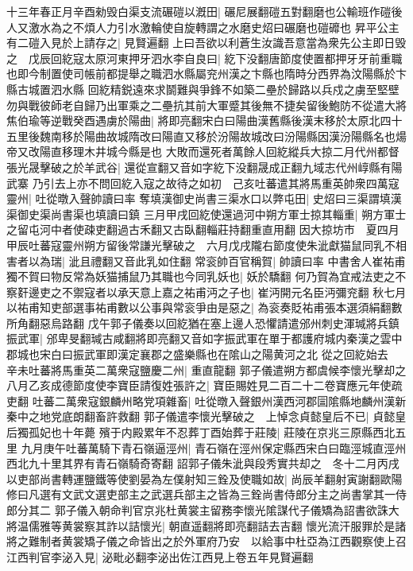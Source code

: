 十三年春正月辛酉勑毁白渠支流碾磑以漑田|{
	碾尼展翻磑五對翻磨也公輸班作磑後人又激水為之不煩人力引水激輪使自旋轉謂之水磨史炤曰碾磨也磑䃺也}
昇平公主有二磑入見於上請存之|{
	見賢遍翻}
上曰吾欲以利蒼生汝識吾意當為衆先公主即日毁之　戊辰回紇寇太原河東押牙泗水李自良曰|{
	紇下没翻唐節度使置都押牙牙前重職也即今制置使司帳前都提舉之職泗水縣屬兖州漢之卞縣也隋時分西界為汶陽縣於卞縣古城置泗水縣}
回紇精鋭遠來求鬬難與爭鋒不如築二壘於歸路以兵戍之虜至堅壁勿與戰彼師老自歸乃出軍乘之二壘抗其前大軍蹙其後無不捷矣留後鮑防不從遣大將焦伯瑜等逆戰癸酉遇虜於陽曲|{
	將即亮翻宋白曰陽曲漢舊縣後漢末移於太原北四十五里後魏南移於陽曲故城隋改曰陽直又移於汾陽故城改曰汾陽縣因漢汾陽縣名也煬帝又改陽直移理木井城今縣是也}
大敗而還死者萬餘人回紇縱兵大掠二月代州都督張光晟擊破之於羊武谷|{
	還從宣翻又音如字紇下没翻晟成正翻九域志代州崞縣有陽武寨}
乃引去上亦不問回紇入寇之故待之如初　己亥吐蕃遣其將馬重英帥衆四萬寇靈州|{
	吐從暾入聲帥讀曰率}
奪填漢御史尚書三渠水口以弊屯田|{
	史炤曰三渠謂填漢渠御史渠尚書渠也填讀曰鎮}
三月甲戌回紇使還過河中朔方軍士掠其輜重|{
	朔方軍士之留屯河中者使疎吏翻過古禾翻又古臥翻輜莊持翻重直用翻}
因大掠坊市　夏四月甲辰吐蕃寇靈州朔方留後常謙光擊破之　六月戊戌隴右節度使朱泚獻猫鼠同乳不相害者以為瑞|{
	泚且禮翻又音此乳如住翻}
常衮帥百官稱賀|{
	帥讀曰率}
中書舍人崔祐甫獨不賀曰物反常為妖猫捕鼠乃其職也今同乳妖也|{
	妖於驕翻}
何乃賀為宜戒法吏之不察姧邊吏之不禦寇者以承天意上嘉之祐甫沔之子也|{
	崔沔開元名臣沔彌兖翻}
秋七月以祐甫知吏部選事祐甫數以公事與常衮爭由是惡之|{
	為衮奏貶祐甫張本選須絹翻數所角翻惡烏路翻}
戊午郭子儀奏以回紇猶在塞上邊人恐懼請遣邠州刺史渾瑊將兵鎮振武軍|{
	邠卑旻翻瑊古咸翻將即亮翻又音如字振武軍在單于都護府城内秦漢之雲中郡城也宋白曰振武軍即漢定襄郡之盛樂縣也在隂山之陽黄河之北}
從之回紇始去　辛未吐蕃將馬重英二萬衆寇鹽慶二州|{
	重直龍翻}
郭子儀遣朔方都虞候李懷光擊却之　八月乙亥成德節度使李寶臣請復姓張許之|{
	寶臣賜姓見二百二十二卷寶應元年使疏吏翻}
吐蕃二萬衆寇銀麟州略党項雜畜|{
	吐從暾入聲銀州漢西河郡圁隂縣地麟州漢新秦中之地党底朗翻畜許救翻}
郭子儀遣李懷光擊破之　上悼念貞懿皇后不已|{
	貞懿皇后獨孤妃也十年薨}
殯于内殿累年不忍葬丁酉始葬于莊陵|{
	莊陵在京兆三原縣西北五里}
九月庚午吐蕃萬騎下青石嶺逼涇州|{
	青石嶺在涇州保定縣西宋白曰臨涇城直涇州西北九十里其界有青石嶺騎奇寄翻}
詔郭子儀朱泚與段秀實共却之　冬十二月丙戌以吏部尚書轉運鹽鐵等使劉晏為左僕射知三銓及使職如故|{
	尚辰羊翻射寅謝翻歐陽修曰凡選有文武文選吏部主之武選兵部主之皆為三銓尚書侍郎分主之尚書掌其一侍郎分其二}
郭子儀入朝命判官京兆杜黄裳主留務李懷光隂謀代子儀矯為詔書欲誅大將温儒雅等黄裳察其詐以詰懷光|{
	朝直遥翻將即亮翻詰去吉翻}
懷光流汗服罪於是諸將之難制者黄裳矯子儀之命皆出之於外軍府乃安　以給事中杜亞為江西觀察使上召江西判官李泌入見|{
	泌毗必翻李泌出佐江西見上卷五年見賢遍翻}
